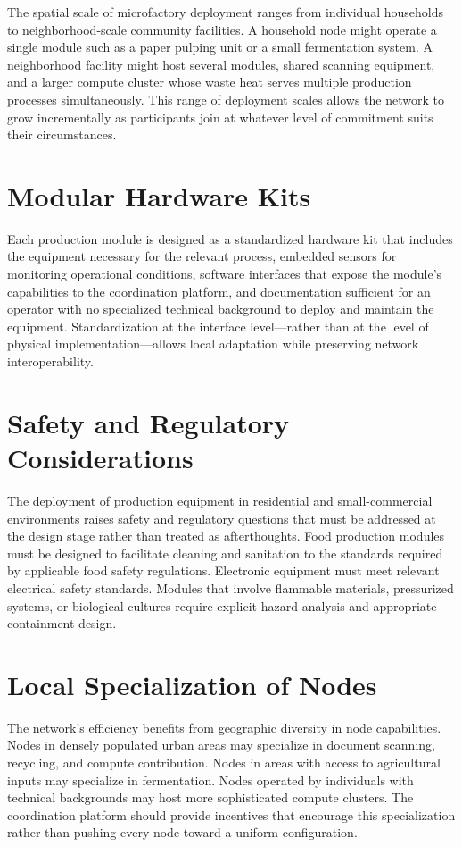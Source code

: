 \documentclass[12pt]{book}
\theoremstyle{definition}
\theoremstyle{remark}
\begin{document}
The spatial scale of microfactory deployment ranges from individual
households to neighborhood-scale community facilities. A household
node might operate a single module such as a paper pulping unit or
a small fermentation system. A neighborhood facility might host
several modules, shared scanning equipment, and a larger compute
cluster whose waste heat serves multiple production processes
simultaneously. This range of deployment scales allows the network
to grow incrementally as participants join at whatever level of
commitment suits their circumstances.

\section{Modular Hardware Kits}

Each production module is designed as a standardized hardware kit
that includes the equipment necessary for the relevant process,
embedded sensors for monitoring operational conditions, software
interfaces that expose the module's capabilities to the coordination
platform, and documentation sufficient for an operator with no
specialized technical background to deploy and maintain the
equipment. Standardization at the interface level---rather than at
the level of physical implementation---allows local adaptation while
preserving network interoperability.

\section{Safety and Regulatory Considerations}

The deployment of production equipment in residential and
small-commercial environments raises safety and regulatory questions
that must be addressed at the design stage rather than treated as
afterthoughts. Food production modules must be designed to facilitate
cleaning and sanitation to the standards required by applicable
food safety regulations. Electronic equipment must meet relevant
electrical safety standards. Modules that involve flammable materials,
pressurized systems, or biological cultures require explicit hazard
analysis and appropriate containment design.

\section{Local Specialization of Nodes}

The network's efficiency benefits from geographic diversity in node
capabilities. Nodes in densely populated urban areas may specialize
in document scanning, recycling, and compute contribution. Nodes in
areas with access to agricultural inputs may specialize in
fermentation. Nodes operated by individuals with technical backgrounds
may host more sophisticated compute clusters. The coordination
platform should provide incentives that encourage this
specialization rather than pushing every node toward a uniform
configuration.
\end{document}
